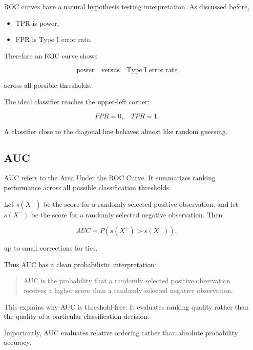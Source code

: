 \documentclass[
  letterpaper,
  DIV=11,
  numbers=noendperiod]{scrreprt}
\providecommand{\tightlist}{%
  \setlength{\itemsep}{0pt}\setlength{\parskip}{0pt}}
\theoremstyle{definition}
\theoremstyle{definition}
\theoremstyle{plain}
\theoremstyle{plain}
\theoremstyle{remark}
\begin{document}
ROC curves have a natural hypothesis testing interpretation. As
discussed before,

\begin{itemize}
\tightlist
\item
  TPR is power,
\item
  FPR is Type I error rate.
\end{itemize}

Therefore an ROC curve shows

\[
\text{power}
\quad\text{versus}\quad
\text{Type I error rate}
\]

across all possible thresholds.

The ideal classifier reaches the upper-left corner:

\[
FPR=0,
\quad
TPR=1.
\]

A classifier close to the diagonal line behaves almost like random
guessing.

\subsection{AUC}\label{auc}

AUC refers to the Area Under the ROC Curve. It summarizes ranking
performance across all possible classification thresholds.

Let \(s(X^+)\) be the score for a randomly selected positive
observation, and let \(s(X^-)\) be the score for a randomly selected
negative observation. Then

\[
AUC
=
P\left(s(X^+)>s(X^-)\right),
\]

up to small corrections for ties.

Thus AUC has a clean probabilistic interpretation:

\begin{quote}
AUC is the probability that a randomly selected positive observation
receives a higher score than a randomly selected negative observation.
\end{quote}

This explains why AUC is threshold-free. It evaluates ranking quality
rather than the quality of a particular classification decision.

Importantly, AUC evaluates relative ordering rather than absolute
probability accuracy.
\end{document}

